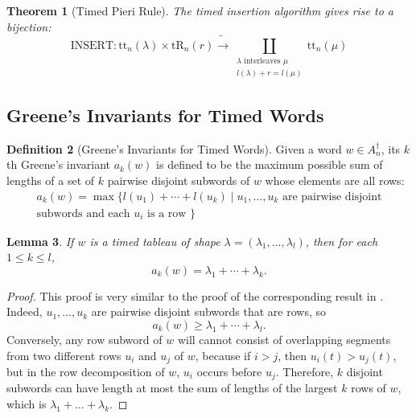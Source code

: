 \documentclass[10pt]{amsproc}
\newtheorem{theorem}{Theorem}[subsection]
\newtheorem{lemma}[theorem]{Lemma}
\theoremstyle{definition}
\newtheorem{definition}[theorem]{Definition}
\theoremstyle{remark}
\newcommand{\ins}{\mathrm{INSERT}}
\newcommand{\ttab}{\mathrm{tt}}
\newcommand{\tr}{\mathrm{tR}}
\begin{document}
\begin{theorem}[Timed Pieri Rule]
  \label{theorem:pieri}
  The timed insertion algorithm gives rise to a bijection:
  \begin{displaymath}
    \ins: \ttab_n(\lambda)\times \tr_n(r) \tilde\to \coprod_{\begin{smallmatrix}\text{$\lambda$ interleaves $\mu$}\\{l(\lambda)+r = l(\mu)}\end{smallmatrix}} \ttab_n(\mu)
  \end{displaymath}
\end{theorem}
\subsection{Greene's Invariants for Timed Words}
\label{sec:timed-greene-invar}
\begin{definition}[Greene's Invariants for Timed Words]
  \label{definition:timed-Greene-invars}
  Given a word $w\in A_n^\dagger$, its $k$th Greene's invariant $a_k(w)$ is defined to be the maximum possible sum of lengths of a set of $k$ pairwise disjoint subwords of $w$ whose elements are all rows:
  \begin{multline*}
    a_k(w) = \max\{l(u_1)+\dotsb+l(u_k)\mid u_1,\dotsc,u_k \text{ are pairwise disjoint}\\ \text{subwords and each $u_i$ is a row }\}
  \end{multline*}
\end{definition}
\begin{lemma}
  \label{lemma:tableau-shape-greene}
  If $w$ is a timed tableau of shape $\lambda=(\lambda_1,\dotsc,\lambda_l)$, then for each $1\leq k\leq l$,
  \begin{displaymath}
    a_k(w) = \lambda_1+\dotsb + \lambda_k.
  \end{displaymath}
\end{lemma}
\begin{proof}
  This proof is very similar to the proof of the corresponding result in \cite{Lascoux}.
  Indeed, $u_1,\dotsc,u_k$ are pairwise disjoint subwords that are rows, so
  \begin{displaymath}
    a_k(w) \geq \lambda_1+\dotsb + \lambda_l.
  \end{displaymath}
  Conversely, any row subword of $w$ will cannot consist of overlapping segments from two different rows $u_i$ and $u_j$ of $w$, because if $i>j$, then $u_i(t)>u_j(t)$, but in the row decomposition of $w$, $u_i$ occurs before $u_j$.
  Therefore, $k$ disjoint subwords can have length at most the sum of lengths of the largest $k$ rows of $w$, which is $\lambda_1+\dotsc+\lambda_k$.
\end{proof}
\end{document}
